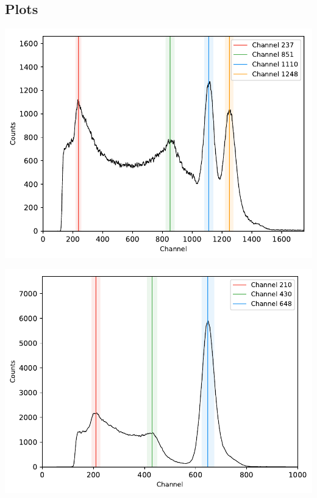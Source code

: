 \subsection*{Plots}
%
\begin{multicols}{2}
%
\minipage{\linewidth}
    \begin{center}
        \captionsetup{type=figure}
        \begin{adjustbox}{max width=\linewidth, keepaspectratio}
            \includegraphics[]{pdf/60Co}
        \end{adjustbox}
        \label{fig:Spectrum60Co}
    \end{center}
\endminipage
%
\vspace{10mm}
%
\minipage{\linewidth}
    \begin{center}
        \captionsetup{type=figure}
        \begin{adjustbox}{max width=\linewidth, keepaspectratio}
            \includegraphics[]{pdf/137Cs}

\end{adjustbox}
\end{center}
\end{multicols}
